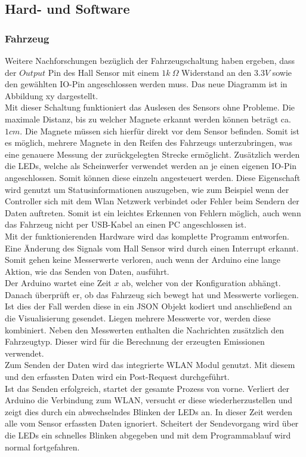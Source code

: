 \documentclass[.../Dokumentation.tex]{subfiles}
\begin{document}
    \subsection{Hard- und Software}\label{sec-ita2-hardware}
    \subsubsection*{Fahrzeug}
    Weitere Nachforschungen bezüglich der Fahrzeugschaltung haben ergeben, dass der $Output$ Pin des Hall Sensor mit einem $1k\ \Omega$  Widerstand an den $3.3V$ sowie den gewählten IO-Pin angeschlossen werden muss. Das neue Diagramm ist in Abbildung xy dargestellt. \\
    Mit dieser Schaltung funktioniert das Auslesen des Sensors ohne Probleme. Die maximale Distanz, bis zu welcher Magnete erkannt werden können beträgt ca. $1 cm$. Die Magnete müssen sich hierfür direkt vor dem Sensor befinden. Somit ist es möglich, mehrere Magnete in den Reifen des Fahrzeugs unterzubringen, was eine genauere Messung der zurückgelegten Strecke ermöglicht. Zusätzlich werden die LEDs, welche als Scheinwerfer verwendet werden an je einen eigenen IO-Pin angeschlossen. Somit können diese einzeln angesteuert werden. Diese Eigenschaft wird genutzt um Statusinformationen auszugeben, wie zum Beispiel wenn der Controller sich mit dem Wlan Netzwerk verbindet oder Fehler beim Sendern der Daten auftreten. Somit ist ein leichtes Erkennen von Fehlern möglich, auch wenn das Fahrzeug nicht per USB-Kabel an einen PC angeschlossen ist.\\
    Mit der funktionierenden Hardware wird das komplette Programm entworfen. Eine Änderung des Signals vom Hall Sensor wird durch einen Interrupt erkannt. Somit gehen keine Messerwerte verloren, auch wenn der Arduino eine lange Aktion, wie das Senden von Daten, ausführt.\\
    Der Arduino wartet eine Zeit $x$ ab, welcher von der Konfiguration abhängt. Danach überprüft er, ob das Fahrzeug sich bewegt hat und Messwerte vorliegen. Ist dies der Fall werden diese in ein JSON Objekt kodiert und anschließend an die Visualisierung gesendet. Liegen mehrere Messwerte vor, werden diese kombiniert. Neben den Messwerten enthalten die Nachrichten zusätzlich den Fahrzeugtyp. Dieser wird für die Berechnung der erzeugten Emissionen verwendet.\\
    Zum Senden der Daten wird das integrierte WLAN Modul genutzt. Mit diesem und den erfassten Daten wird ein Post-Request durchgeführt.\\
   	Ist das Senden erfolgreich, startet der gesamte Prozess von vorne. Verliert der Arduino die Verbindung zum WLAN, versucht er diese wiederherzustellen und zeigt dies durch ein abwechselndes Blinken der LEDs an. In dieser Zeit werden alle vom Sensor erfassten Daten ignoriert. Scheitert der Sendevorgang wird über die LEDs ein schnelles  Blinken abgegeben und mit dem Programmablauf wird normal fortgefahren. 
\end{document}

